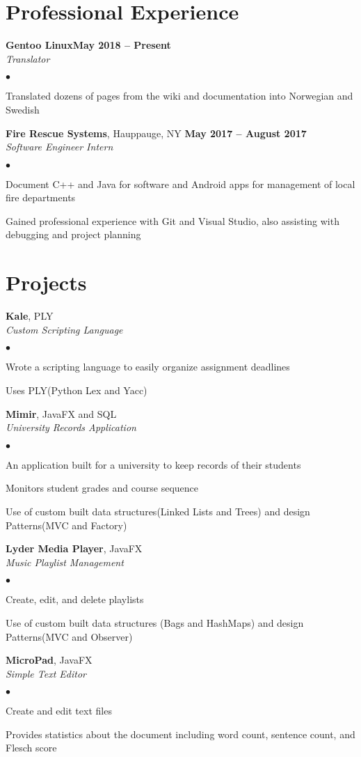 \documentclass[margin,line]{res}
\newenvironment{list2}{
  \begin{list}{$\bullet$}{
      \setlength{\itemsep}{0in}
      \setlength{\parsep}{0in} \setlength{\parskip}{0in}
      \setlength{\topsep}{0in} \setlength{\partopsep}{0in}
      \setlength{\leftmargin}{0.2in}}}{\end{list}}
\begin{document}
\begin{resume}
\section{\sc Professional Experience}
{\bf Gentoo Linux}\hfill {\bf May 2018 -- Present}\\
{\em Translator}
\begin{list2} %
\item Translated dozens of pages from the wiki and documentation into Norwegian and Swedish
\end{list2}
{\bf Fire Rescue Systems}, Hauppauge, NY \hfill {\bf May 2017 -- August 2017}\\
{\em Software Engineer Intern}
\begin{list2} %
\item Document C++ and Java for software and Android apps for management of local fire departments
\item Gained professional experience with Git and Visual Studio, also assisting with debugging and project planning
\end{list2}

\section{\sc Projects}
{\bf Kale}, PLY\\
{\em Custom Scripting Language}
\begin{list2}
\item Wrote a scripting language to easily organize assignment deadlines
\item Uses PLY(Python Lex and Yacc) 
\end{list2}
{\bf Mimir}, JavaFX and SQL\\
{\em University Records Application}
\begin{list2}
\item An application built for a university to keep records of their students
\item Monitors student grades and course sequence
\item Use of custom built data structures(Linked Lists and Trees) and design Patterns(MVC and Factory)
\end{list2}
{\bf Lyder Media Player}, JavaFX\\
{\em Music Playlist Management}
\begin{list2}
\item Create, edit, and delete playlists
\item Use of custom built data structures (Bags and HashMaps) and design Patterns(MVC and Observer)
\end{list2}
{\bf MicroPad}, JavaFX\\
{\em Simple Text Editor}
\begin{list2}
\item Create and edit text files
\item Provides statistics about the document including word count, sentence count, and Flesch score
\end{list2}

\end{resume}
\end{document}
